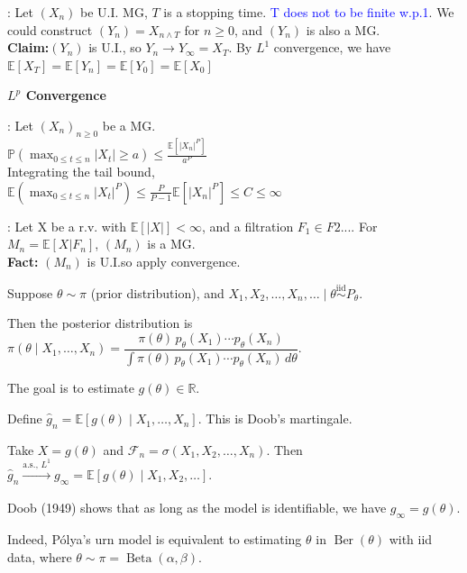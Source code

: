 \documentclass[a4paper, landscape]{article}
\newcommand{\topic}[1]{\par\medskip\textbf{#1}\par}
\newcommand{\subtopic}[1]{\par\textbf{#1}}
\renewcommand{\topic}[1]{\par\medskip\noindent\colorbox{highlightcolor}{\parbox{\dimexpr\columnwidth-2\fboxsep\relax}{\textbf{#1}}}\par}
\renewcommand{\subtopic}[1]{\par\textbf{\color{blue}{#1}}} %
\begin{document}
\begin{multicols}{4}
 \subtopic{Connection between OST and MG convergence}: Let $(X_n)$ be U.I. MG, $T$ is a stopping time. \textcolor{blue}{T does not to be finite w.p.1}. We could construct $(Y_n)=X_{n \land T}$ for $n\geqslant0$, and $(Y_n)$ is also a MG.\\
 \textbf{Claim:}$(Y_n)$ is U.I., so $Y_n\to Y_\infty=X_T$. By $L^1$ convergence, we have $\mathbb E[X_T]=\mathbb E[Y_n]=\mathbb E[Y_0]=\mathbb E[X_0]$
 \topic{$L^p$ Convergence}
 \subtopic{Doob's $L^p$ maximum inequality}: Let $(X_n)_{n\geqslant0}$ be a MG.\\
$ \mathbb P(\max_{0\leqslant t\leqslant n}|X_t|\geqslant a)\leqslant\frac{\mathbb E[|X_n|^P]}{a^P}$\\
 Integrating the tail bound,\\
$\mathbb E(\max_{0\leqslant t\leqslant n}|X_t|^P)\leqslant\frac{P}{P-1}\mathbb E[|X_n|^P]\leqslant C\leqslant \infty$
\subtopic{Doob's MG}: Let X be a r.v. with $\mathbb E[|X|]<\infty$, and a filtration $F_1\in F2....$ For $M_n=\mathbb E[X|F_n]$, $(M_n)$ is a MG.\\
\textbf{Fact:} $(M_n)$ is U.I.so apply convergence.

\subtopic{Application in Statistics.}
Suppose \(\theta\sim \pi\) (prior distribution), and
\(X_1,X_2,\ldots,X_n,\ldots\mid \theta \overset{\text{iid}}{\sim} P_\theta.\)

Then the posterior distribution is
\(\pi(\theta\mid X_1,\ldots,X_n)
=
\dfrac{\pi(\theta)\,p_\theta(X_1)\cdots p_\theta(X_n)}
{\int \pi(\theta)\,p_\theta(X_1)\cdots p_\theta(X_n)\,d\theta}.\)

The goal is to estimate \(g(\theta)\in\mathbb{R}.\)

Define
\(\hat g_n=\mathbb{E}[g(\theta)\mid X_1,\ldots,X_n].\)
This is Doob's martingale.

Take \(X=g(\theta)\) and \(\mathcal{F}_n=\sigma(X_1,X_2,\ldots,X_n).\) Then
\(\hat g_n \xrightarrow[\ ]{\text{a.s.},\,L^1} g_\infty
=
\mathbb{E}[g(\theta)\mid X_1,X_2,\ldots].\)

Doob (1949) shows that as long as the model is identifiable, we have
\(g_\infty=g(\theta).\)

Indeed, Pólya's urn model is equivalent to estimating \(\theta\) in \(\operatorname{Ber}(\theta)\)
with iid data, where \(\theta\sim \pi=\operatorname{Beta}(\alpha,\beta).\)


 





\end{multicols}
\end{document}
